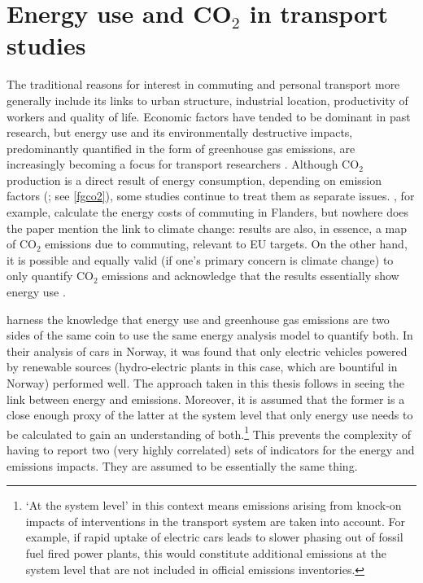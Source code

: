 \documentclass[a4paper, 11pt, twoside]{Thesis}
\begin{document}
\section{Energy use and CO$_2$ in transport studies}
\label{s:energy}
The traditional reasons for interest in commuting and  personal transport
more generally include its links to urban structure, industrial location,
productivity of workers and  quality of life. Economic factors have
tended to be dominant in past research,
but energy use and its environmentally destructive impacts,
predominantly quantified in the form of greenhouse gas emissions,
are increasingly becoming a focus for transport researchers \citep{Chapman2007}.
Although CO$_2$ production is a direct result of energy consumption,
depending on emission factors (\citealp{Defra2011}; see \cref{fgco2}), some studies continue to
treat them as separate issues. \citet{Boussauw2009}, for example,
calculate the energy costs of commuting in Flanders, but nowhere does
the paper mention the link to climate change: results are also, in essence,
a map of CO$_2$ emissions due to commuting, relevant to EU targets.
On the other hand,
it is possible and equally valid (if one's primary concern is climate change)
to only quantify CO$_2$ emissions and acknowledge
that the results essentially show energy use \citep{smith2011polycentricity}.

\citet{Simonsen2011} harness the knowledge that energy use
and greenhouse gas emissions are two sides of the same coin to use the
same energy analysis model to quantify both. In their analysis of cars in Norway,
it was found that only electric vehicles powered by renewable
sources (hydro-electric plants in this case, which are bountiful in Norway)
performed well. The approach taken in this thesis follows
\citet{Simonsen2011} in seeing the link
between energy and emissions.
Moreover, it is assumed that the former is a close enough proxy of the latter
at the system level that only energy use needs to be
calculated to gain an understanding of
both.\footnote{`At
the system level'
in this context means emissions arising from knock-on impacts of
interventions in the transport system are taken into account.
For example, if rapid uptake of electric cars leads to slower phasing
out of fossil fuel fired power plants, this would constitute
additional emissions at the system level that are not included in
official emissions inventories.
}
This prevents the complexity of having to report two (very highly correlated)
sets of indicators for the energy and emissions impacts. They are assumed to
be essentially the same thing.
\end{document}
